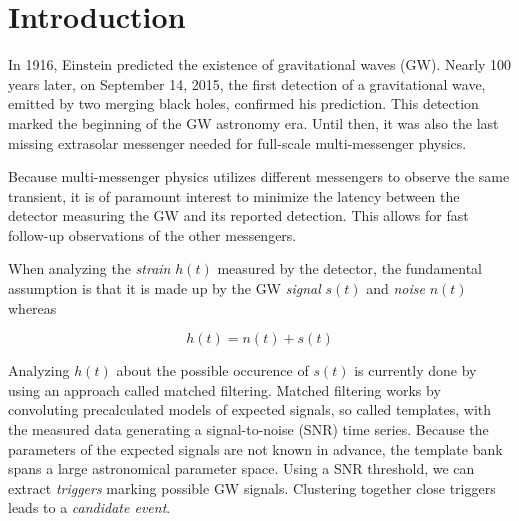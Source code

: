 

\section{Introduction}
In 1916, Einstein predicted the existence of gravitational waves (GW). Nearly
100 years later, on September 14, 2015, the first detection of a gravitational
wave\cite{PhysRevLett.116.061102}, emitted by two merging black holes, confirmed
his prediction. This detection marked the beginning of the GW astronomy era.
Until then, it was also the last missing extrasolar messenger needed for 
full-scale multi-messenger physics.
\cite{Branchesi_2016} 

Because multi-messenger physics utilizes different messengers to observe the 
same transient, it is of paramount interest to minimize the latency between 
the detector measuring the GW and its reported detection. This allows for
fast follow-up observations of the other messengers.

When analyzing the \textit{strain} $h(t)$ measured by the detector, the
fundamental assumption is that it is made up by the GW \textit{signal} $s(t)$
and \textit{noise} $n(t)$ whereas

\begin{equation}
  h(t) = n(t) + s(t)
\end{equation}

Analyzing $h(t)$ about the possible occurence of $s(t)$ is currently done by
using an approach called matched filtering. Matched filtering works by 
convoluting precalculated models of expected signals, so called templates, with
the measured data generating a signal-to-noise (SNR) time series. Because the
parameters of the expected signals are not known in advance, the template bank
spans a large astronomical parameter space.
Using a SNR threshold, we can extract \textit{triggers} marking possible GW 
signals. Clustering together close triggers leads to a \textit{candidate event}.

